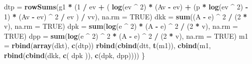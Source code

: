 \documentclass[]{article}
\newenvironment{Shaded}{\begin{snugshade}}{\end{snugshade}}
\newcommand{\DataTypeTok}[1]{\textcolor[rgb]{0.13,0.29,0.53}{#1}}
\newcommand{\DecValTok}[1]{\textcolor[rgb]{0.00,0.00,0.81}{#1}}
\newcommand{\KeywordTok}[1]{\textcolor[rgb]{0.13,0.29,0.53}{\textbf{#1}}}
\newcommand{\NormalTok}[1]{#1}
\newcommand{\OperatorTok}[1]{\textcolor[rgb]{0.81,0.36,0.00}{\textbf{#1}}}
\newcommand{\OtherTok}[1]{\textcolor[rgb]{0.56,0.35,0.01}{#1}}
\newcommand{\StringTok}[1]{\textcolor[rgb]{0.31,0.60,0.02}{#1}}
\begin{document}
\begin{Shaded}
\begin{Highlighting}[]
\NormalTok{  dtp =}\StringTok{ }\KeywordTok{rowSums}\NormalTok{(g1 }\OperatorTok{*}\StringTok{ }\NormalTok{(}\DecValTok{1} \OperatorTok{/}\StringTok{ }\NormalTok{ev }\OperatorTok{+}\StringTok{ }\NormalTok{(}
    \KeywordTok{log}\NormalTok{(ev }\OperatorTok{^}\StringTok{ }\DecValTok{2}\NormalTok{) }\OperatorTok{*}\StringTok{ }\NormalTok{(Av }\OperatorTok{-}\StringTok{ }\NormalTok{ev) }\OperatorTok{+}\StringTok{ }\NormalTok{(p }\OperatorTok{*}\StringTok{ }\KeywordTok{log}\NormalTok{(ev }\OperatorTok{^}\StringTok{ }\DecValTok{2}\NormalTok{) }\OperatorTok{-}\StringTok{ }\DecValTok{1}\NormalTok{) }\OperatorTok{*}\StringTok{ }\NormalTok{(Av }\OperatorTok{-}\StringTok{ }\NormalTok{ev) }\OperatorTok{^}\StringTok{ }\DecValTok{2} \OperatorTok{/}\StringTok{ }\NormalTok{ev}
\NormalTok{  ) }\OperatorTok{/}\StringTok{ }\NormalTok{vv),}
  \DataTypeTok{na.rm =} \OtherTok{TRUE}\NormalTok{)}
\NormalTok{  dkk =}\StringTok{ }\KeywordTok{sum}\NormalTok{((A }\OperatorTok{-}\StringTok{ }\NormalTok{e) }\OperatorTok{^}\StringTok{ }\DecValTok{2} \OperatorTok{/}\StringTok{ }\NormalTok{(}\DecValTok{2} \OperatorTok{*}\StringTok{ }\NormalTok{v), }\DataTypeTok{na.rm =} \OtherTok{TRUE}\NormalTok{)}
\NormalTok{  dpk =}\StringTok{ }\KeywordTok{sum}\NormalTok{(}\KeywordTok{log}\NormalTok{(e }\OperatorTok{^}\StringTok{ }\DecValTok{2}\NormalTok{) }\OperatorTok{*}\StringTok{ }\NormalTok{(A }\OperatorTok{-}\StringTok{ }\NormalTok{e) }\OperatorTok{^}\StringTok{ }\DecValTok{2} \OperatorTok{/}\StringTok{ }\NormalTok{(}\DecValTok{2} \OperatorTok{*}\StringTok{ }\NormalTok{v), }\DataTypeTok{na.rm =} \OtherTok{TRUE}\NormalTok{)}
\NormalTok{  dpp =}\StringTok{ }\KeywordTok{sum}\NormalTok{(}\KeywordTok{log}\NormalTok{(e }\OperatorTok{^}\StringTok{ }\DecValTok{2}\NormalTok{) }\OperatorTok{^}\StringTok{ }\DecValTok{2} \OperatorTok{*}\StringTok{ }\NormalTok{(A }\OperatorTok{-}\StringTok{ }\NormalTok{e) }\OperatorTok{^}\StringTok{ }\DecValTok{2} \OperatorTok{/}\StringTok{ }\NormalTok{(}\DecValTok{2} \OperatorTok{*}\StringTok{ }\NormalTok{v), }\DataTypeTok{na.rm =} \OtherTok{TRUE}\NormalTok{)}
\NormalTok{  m1 =}\StringTok{ }\KeywordTok{rbind}\NormalTok{(}\KeywordTok{array}\NormalTok{(dkt), }\KeywordTok{c}\NormalTok{(dtp))}
  \KeywordTok{rbind}\NormalTok{(}\KeywordTok{cbind}\NormalTok{(dtt, }\KeywordTok{t}\NormalTok{(m1)), }\KeywordTok{cbind}\NormalTok{(m1, }\KeywordTok{rbind}\NormalTok{(}\KeywordTok{cbind}\NormalTok{(dkk, }\KeywordTok{c}\NormalTok{(}
\NormalTok{    dpk}
\NormalTok{  )), }\KeywordTok{c}\NormalTok{(dpk, dpp))))}
\NormalTok{\}}
\end{Highlighting}
\end{Shaded}
\end{document}

